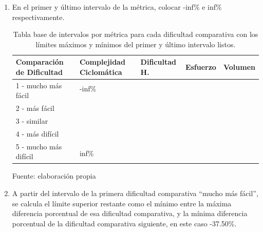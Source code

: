 \documentclass[letterpaper,12pt]{article}
\begin{document}
\begin{enumerate}
  \item En el primer y último intervalo de la métrica, colocar -inf\% e inf\% respectivamente.
        \begin{table}[H]
          \centering
          \begin{tabular}{|l|l|l|l|l|}
            \hline
            Comparación de Dificultad              & Complejidad Ciclomática & Dificultad H. & Esfuerzo & Volumen \\ \hline
            \multirow{2}{*}{1 - mucho más fácil}   & -inf\%                  &               &          &         \\ \cline{2-5}
                                                   &                         &               &          &         \\ \hline
            \multirow{2}{*}{2 - más fácil}         &                         &               &          &         \\ \cline{2-5}
                                                   &                         &               &          &         \\ \hline
            \multirow{2}{*}{3 - similar}           &                         &               &          &         \\ \cline{2-5}
                                                   &                         &               &          &         \\ \hline
            \multirow{2}{*}{4 - más difícil}       &                         &               &          &         \\ \cline{2-5}
                                                   &                         &               &          &         \\ \hline
            \multirow{2}{*}{5 - mucho más difícil} &                         &               &          &         \\ \cline{2-5}
                                                   & inf\%                   &               &          &         \\ \hline
          \end{tabular}
          \caption{Tabla base de intervalos por métrica para cada dificultad comparativa con los límites máximos y mínimos del primer y último intervalo listos.} Fuente: elaboración propia
          \label{tab:base-int-table-infs}
        \end{table}
  \item A partir del intervalo de la primera dificultad comparativa ``mucho más fácil'', se calcula el límite superior restante como el mínimo entre la máxima diferencia porcentual de esa dificultad comparativa, y la mínima diferencia porcentual de la dificultad comparativa siguiente, en este caso -37.50\%.


\end{enumerate}
\end{document}
